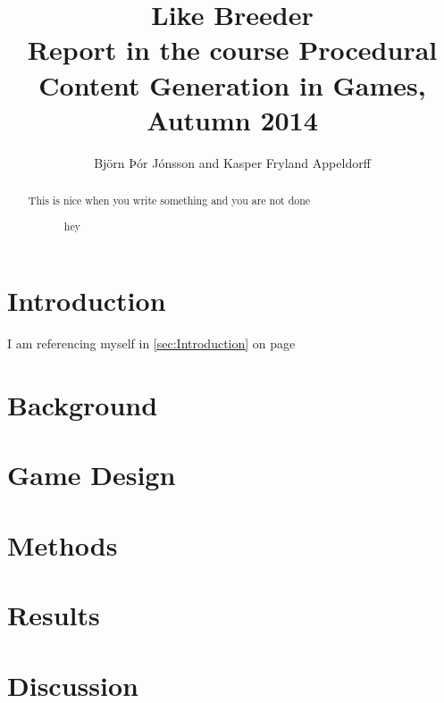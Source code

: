 \documentclass[]{article}
\title{Like Breeder\\ \small Report in the course Procedural Content Generation in Games, Autumn 2014}
\author{Björn Þór Jónsson and Kasper Fryland Appeldorff}
\begin{document}

\listoftodos %
\newpage
\begin{abstract}
This is nice when you write something and you are not done 
\begin{figure}[h!]
\caption{hey}
\label{fig:test}
\end{figure}
\end{abstract}

\section{Introduction}
\label{sec:Introduction}
I am referencing myself in \autoref{sec:Introduction} on page \pageref{sec:Introduction}
\section{Background}
\label{sec:Background}
\section{Game Design}
\label{sec:GameDesign}
\section{Methods}
\label{sec:Methods}
\section{Results}
\label{sec:Results}
\section{Discussion}
\label{sec:Discussion}



\end{document}

